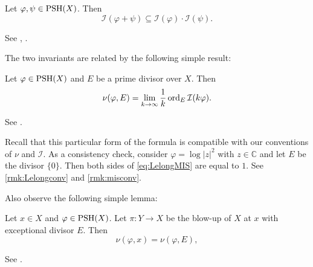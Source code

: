 \begin{theorem}\label{thm:multipsubadd}
    Let $\varphi,\psi\in \mathrm{PSH}(X)$. Then
    \[
        \mathcal{I}(\varphi+\psi)\subseteq \mathcal{I}(\varphi)\cdot \mathcal{I}(\psi).
    \]
\end{theorem}
See \cite{DEL00}, \cite[Theorem~14.2]{Dem12}.

The two invariants are related by the following simple result:
\begin{proposition}\label{prop:Lelongnumfrommis}
    Let $\varphi\in \mathrm{PSH}(X)$ and $E$ be a prime divisor over $X$. Then
    \begin{equation}\label{eq:LelongMIS}
        \nu(\varphi,E)=\lim_{k\to\infty}\frac{1}{k}\operatorname{ord}_E\mathcal{I}(k\varphi).
    \end{equation}
\end{proposition}
See \cite[Proposition~2.14]{DX21}.

Recall that this particular form of the formula is compatible with our conventions of $\nu$ and $\mathcal{I}$. As a consistency check, consider $\varphi=\log |z|^2$ with $z\in \mathbb{C}$ and let $E$ be the divisor $\{0\}$. Then both sides of \eqref{eq:LelongMIS} are equal to $1$. See \cref{rmk:Lelongconv} and \cref{rmk:misconv}.

Also observe the following simple lemma:
\begin{lemma}\label{lma:blowupLelong}
    Let $x \in X$ and $\varphi\in \mathrm{PSH}(X)$. Let $\pi\colon Y\rightarrow X$ be the blow-up of $X$ at $x$ with exceptional divisor $E$.
    Then
    \[
        \nu(\varphi,x)=\nu(\varphi,E),
    \]
\end{lemma}
See \cite[Corollaire~1.1.8]{Bou02}.


